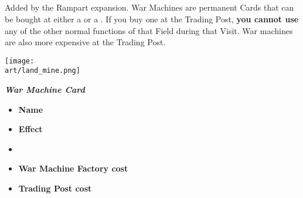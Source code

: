 \begin{multicols*}{2}

\subsection*{}
Added by the Rampart expansion.
War Machines are permanent Cards that can be bought at either a  or a .
If you buy one at the Trading Post, \textbf{you cannot use} any of the other normal functions of that Field during that Visit.
War machines are also more expensive at the Trading Post.

\vspace*{\fill}

\begin{center}
  \texttt{[image: \\art/land\_mine.png]}
\end{center}

\columnbreak

\vfill

\begin{minipage}[h]{\linewidth}
  \vspace{0pt}
  \centering
  \begin{scriptsize}
  \end{scriptsize}
  \break
  \footnotesize{\textbf{\textit{\textcolor{darkcandyapplered}{War Machine Card}}}}
  \scriptsize
  \begin{multicols}{2}
    \begin{itemize}
      \item[\textbf{1.}] \textbf{Name}
      \item[\textbf{2.}] \textbf{Effect}
      \item[\textbf{\phantom{.}}] \phantom{.}
      \item[\textbf{3.}] \textbf{War Machine Factory cost}
      \item[\textbf{4.}] \textbf{Trading Post cost}
    \end{itemize}
  \end{multicols}
\end{minipage}


\end{multicols*}
